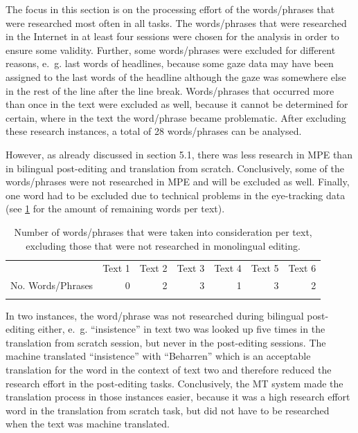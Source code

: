 \documentclass[output=paper]{langsci/langscibook}
\begin{document}
The focus in this section is on the processing effort of the words/phrases that were researched most often in all tasks. The words/phrases that were researched in the Internet in at least four sessions were chosen for the analysis in order to ensure some validity. Further, some words/phrases were excluded for different reasons, e.~g. last words of headlines, because some gaze data may have been assigned to the last words of the headline although the gaze was somewhere else in the  rest of the line after the line break. Words/phrases that occurred more than once in the text were excluded as well, because it cannot be determined for certain, where in the text the word/phrase became problematic. After excluding these research instances, a total of 28 words/phrases can be analysed.


However, as already discussed in section 5.1, there was less research in MPE than in bilingual post-editing and translation from scratch. Conclusively, some of the words/phrases were not researched in MPE and will be excluded as well. Finally, one word had to be excluded due to technical problems in the eye-tracking data (see \ref{tab:2} for the amount of remaining words per text). 

\begin{table}
\begin{tabular}{lrrrrrr} & Text 1 & Text 2 & Text 3 & Text 4 & Text 5 & Text 6\\
\lsptoprule
No. Words/Phrases & 0 & 2 & 3 & 1 & 3 & 2\\
\lspbottomrule
\end{tabular}
\caption{Number of words/phrases that were taken into consideration per text, excluding those that were not researched in monolingual editing.}
\label{tab:2}
\end{table}



In two instances, the word/phrase was not researched during bilingual post-editing either, e.~g. “insistence” in text two was looked up five times in the translation from scratch session, but never in the post-editing sessions. The machine translated “insistence” with “Beharren” which is an acceptable translation for the word in the context of text two and therefore reduced the research effort in the post-editing tasks. Conclusively, the MT system made the translation process in those instances easier, because it was a high research effort word in the translation from scratch task, but did not have to be researched when the text was machine translated.
\end{document}
